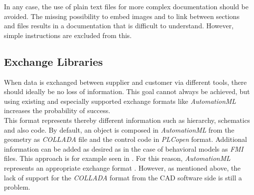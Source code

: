 	In any case, the use of plain text files for more complex documentation should be avoided. The missing possibility to embed images and to link between sections and files results in a documentation that is difficult to understand. However, simple instructions are excluded from this. 

\subsection{Exchange Libraries}     %
	When data is exchanged between supplier and customer via different tools, there should ideally be no loss of information. This goal cannot always be achieved, but using existing and especially supported exchange formats like \textit{AutomationML} increases the probability of success.  \\
	
	This format represents thereby different information such as hierarchy, schematics and also code. By default, an object is composed in \textit{AutomationML} from the geometry as \textit{COLLADA} file and the control code in \textit{PLCopen} format. Additional information can be added as desired as in the case of behavioral models as \textit{FMI} files. This approach is for example seen in \cite{AutomationMLWithFMU}. For this reason, \textit{AutomationML} represents an appropriate exchange format \cite{PaperIsAMLanAppropriateExchangeFormat}. However, as mentioned above, the lack of support for the \textit{COLLADA} format from the CAD software side is still a problem.
	
	



